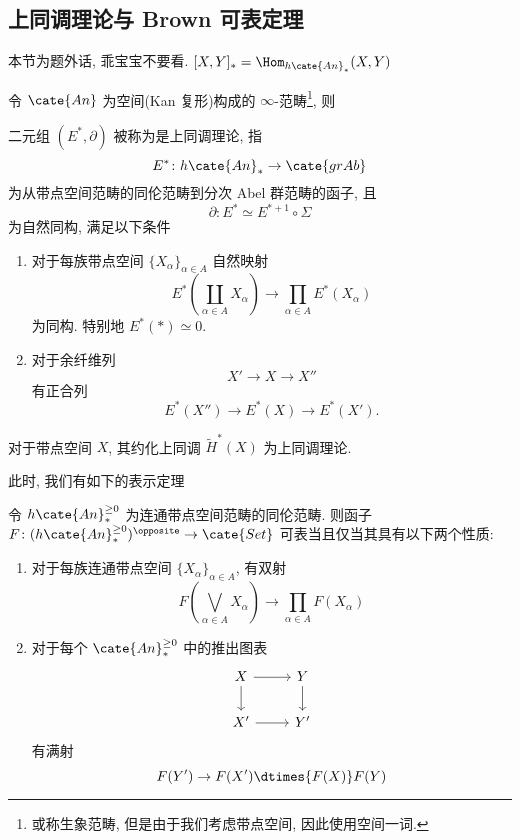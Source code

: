\subsection{上同调理论与 Brown 可表定理}
\begin{remark}
    本节为题外话, 乖宝宝不要看. $[X,Y]_* = \Hom_{h\cate{An}_*}(X,Y)$
\end{remark}
令 $\cate{An}$ 为空间(Kan 复形)构成的 $\infty$-范畴\footnote{或称生象范畴, 但是由于我们考虑带点空间, 因此使用空间一词.}, 则
\begin{definition}
    二元组 $(E^*,\partial)$ 被称为是上同调理论, 指
    \[
    E^* \colon h\cate{An}_* \to \cate{grAb}
    \]
    为从带点空间范畴的同伦范畴到分次 Abel 群范畴的函子, 且
    \[
    \partial \colon E^* \simeq E^{*+1}\circ \Sigma
    \]
    为自然同构, 满足以下条件
    \begin{enumerate}
        \item 对于每族带点空间 $\{X_{\alpha}\}_{\alpha \in A}$ 自然映射
        \[
        E^*(\coprod_{\alpha \in A}X_{\alpha}) \to \prod_{\alpha \in A}E^*(X_{\alpha})
        \]
        为同构. 特别地 $E^*(*) \simeq 0$.
        \item 对于余纤维列
        \[
        X' \to X \to X''
        \]
        有正合列
        \[
        E^*(X'') \to E^*(X) \to E^*(X').
        \]
    \end{enumerate}
\end{definition}
\begin{example}
    对于带点空间 $X$, 其约化上同调 $\tilde{H}^*(X)$ 为上同调理论.
\end{example}
此时, 我们有如下的表示定理
\begin{theorem}\label{定理-Brown 可表}
    令 $h\cate{An}_*^{\geq 0}$ 为连通带点空间范畴的同伦范畴. 则函子 $F \colon (h\cate{An}_*^{\geq 0})^{\opposite}\to \cate{Set}$ 可表当且仅当其具有以下两个性质:
    \begin{enumerate}
        \item 对于每族连通带点空间 $\{X_{\alpha}\}_{\alpha \in A}$, 有双射
        \[
        F(\bigvee_{\alpha \in A}X_{\alpha}) \to \prod_{\alpha \in A}F(X_{\alpha})
        \]
        \item 对于每个 $\cate{An}_*^{\geq 0}$ 中的推出图表
        \[\begin{tikzcd}
	X & Y \\
	{X'} & {Y'}
	\arrow[from=1-1, to=1-2]
	\arrow[from=1-1, to=2-1]
	\arrow[from=1-2, to=2-2]
	\arrow[from=2-1, to=2-2]
        \end{tikzcd}\]
        有满射
        \[
        F(Y') \to F(X') \dtimes{F(X)} F(Y)
        \]
    \end{enumerate}
\end{theorem}
